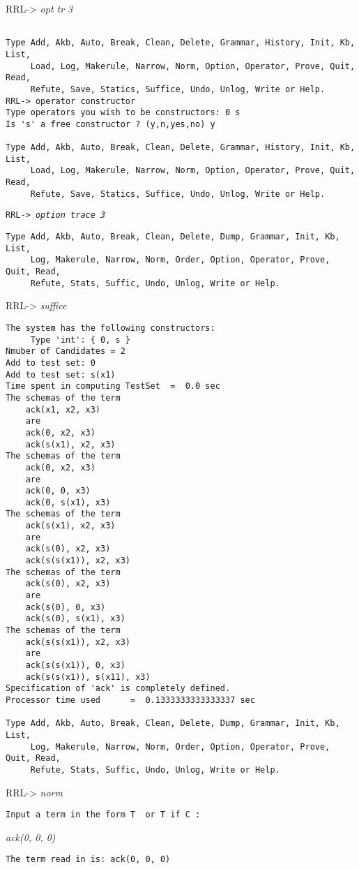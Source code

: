 RRL-> {\em opt tr 3}
\begin{verbatim}

Type Add, Akb, Auto, Break, Clean, Delete, Grammar, History, Init, Kb, List,
     Load, Log, Makerule, Narrow, Norm, Option, Operator, Prove, Quit, Read,
     Refute, Save, Statics, Suffice, Undo, Unlog, Write or Help.
RRL-> operator constructor
Type operators you wish to be constructors: 0 s
Is 's' a free constructor ? (y,n,yes,no) y

Type Add, Akb, Auto, Break, Clean, Delete, Grammar, History, Init, Kb, List,
     Load, Log, Makerule, Narrow, Norm, Option, Operator, Prove, Quit, Read,
     Refute, Save, Statics, Suffice, Undo, Unlog, Write or Help.
\end{verbatim}
\tt RRL-> \em option trace 3\tt
\begin{verbatim}
Type Add, Akb, Auto, Break, Clean, Delete, Dump, Grammar, Init, Kb, List,
     Log, Makerule, Narrow, Norm, Order, Option, Operator, Prove, Quit, Read,
     Refute, Stats, Suffic, Undo, Unlog, Write or Help.
\end{verbatim}
RRL-> {\em suffice}
\begin{verbatim}
The system has the following constructors:
     Type 'int': { 0, s }
Nmuber of Candidates = 2
Add to test set: 0
Add to test set: s(x1)
Time spent in computing TestSet  =  0.0 sec
The schemas of the term
    ack(x1, x2, x3)
    are
    ack(0, x2, x3)
    ack(s(x1), x2, x3)
The schemas of the term
    ack(0, x2, x3)
    are
    ack(0, 0, x3)
    ack(0, s(x1), x3)
The schemas of the term
    ack(s(x1), x2, x3)
    are
    ack(s(0), x2, x3)
    ack(s(s(x1)), x2, x3)
The schemas of the term
    ack(s(0), x2, x3)
    are
    ack(s(0), 0, x3)
    ack(s(0), s(x1), x3)
The schemas of the term
    ack(s(s(x1)), x2, x3)
    are
    ack(s(s(x1)), 0, x3)
    ack(s(s(x1)), s(x11), x3)
Specification of 'ack' is completely defined.
Processor time used      =  0.1333333333333337 sec

Type Add, Akb, Auto, Break, Clean, Delete, Dump, Grammar, Init, Kb, List,
     Log, Makerule, Narrow, Norm, Order, Option, Operator, Prove, Quit, Read,
     Refute, Stats, Suffic, Undo, Unlog, Write or Help.
\end{verbatim}
RRL-> {\em norm}
\begin{verbatim}
Input a term in the form T  or T if C :
\end{verbatim}
{\em ack(0, 0, 0)}
\begin{verbatim}
The term read in is: ack(0, 0, 0)
\end{verbatim}
